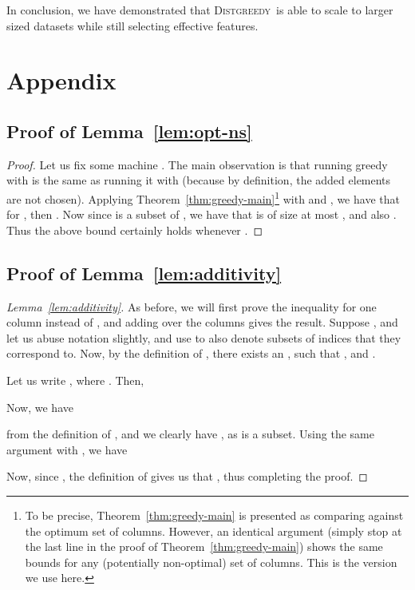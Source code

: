 \documentclass{article}
\newcommand{\distgreedy}{\textsc{Distgreedy}}
\begin{document}
In conclusion, we have demonstrated that \distgreedy\ is able to scale to
larger sized datasets while still selecting effective features.







\clearpage
\appendix


\section{Appendix}

\subsection{Proof of Lemma~\ref{lem:opt-ns}}\label{app:opt-ns}
\begin{proof}
Let us fix some machine . The main observation is that running greedy with  is the same as running it with  (because by definition, the added elements are not chosen).  Applying Theorem~\ref{thm:greedy-main}\footnote{To be precise, Theorem~\ref{thm:greedy-main} is presented as comparing against the optimum set of  columns. However, an identical argument (simply stop at the last line in the proof of Theorem~\ref{thm:greedy-main}) shows the same bounds for any (potentially non-optimal) set of  columns. This is the version we use here.} with  and , we have that for
,
then . Now since  is a subset of , we have that  is of size at most , and also . Thus the above bound certainly holds whenever .
\end{proof}

\subsection{Proof of Lemma~\ref{lem:additivity}} \label{app:additivity}

\begin{proof} [Lemma~\ref{lem:additivity}]
As before, we will first prove the inequality for one column  instead of , and adding over the columns gives the result. Suppose , and let us abuse notation slightly, and use  to also denote subsets of indices that they correspond to. Now, by the definition of , there exists an , such that , and .

Let us write , where . Then,

Now, we have

from the definition of , and we clearly have , as  is a subset. Using the same argument with , we have

Now, since , the definition of  gives us that , thus completing the proof.
\end{proof}
\end{document}
